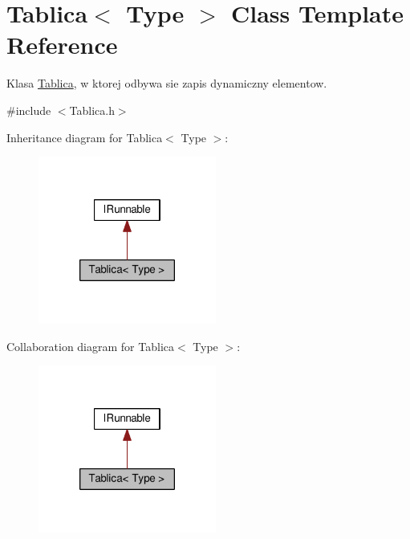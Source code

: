 \hypertarget{class_tablica}{\section{Tablica$<$ Type $>$ Class Template Reference}
\label{class_tablica}
}


Klasa \hyperlink{class_tablica}{Tablica}, w ktorej odbywa sie zapis dynamiczny elementow.  




{\ttfamily \#include $<$Tablica.\-h$>$}



Inheritance diagram for Tablica$<$ Type $>$\-:
\nopagebreak
\begin{figure}[H]
\begin{center}
\leavevmode
\includegraphics[width=166pt]{class_tablica__inherit__graph}
\end{center}
\end{figure}


Collaboration diagram for Tablica$<$ Type $>$\-:
\nopagebreak
\begin{figure}[H]
\begin{center}
\leavevmode
\includegraphics[width=166pt]{class_tablica__coll__graph}
\end{center}
\end{figure}
